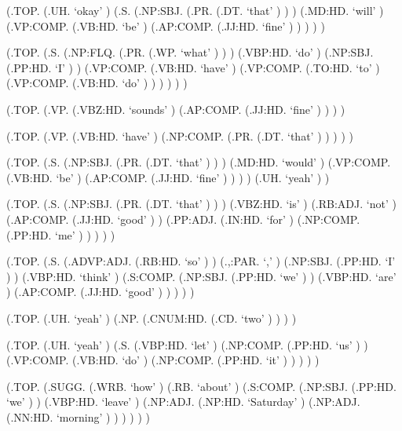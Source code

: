 \documentclass[10pt]{article}
\begin{document}
\begin{parsetree}  (.TOP. (.UH. `okay' ) (.S. (.NP:SBJ. (.PR. (.DT. `that' ) ) ) (.MD:HD. `will' ) (.VP:COMP. (.VB:HD. `be' ) (.AP:COMP. (.JJ:HD. `fine' ) ) ) ) ) \end{parsetree}

\begin{parsetree}  (.TOP. (.S. (.NP:FLQ. (.PR. (.WP. `what' ) ) ) (.VBP:HD. `do' ) (.NP:SBJ. (.PP:HD. `I' ) ) (.VP:COMP. (.VB:HD. `have' ) (.VP:COMP. (.TO:HD. `to' ) (.VP:COMP. (.VB:HD. `do' ) ) ) ) ) ) \end{parsetree}

\begin{parsetree}  (.TOP. (.VP. (.VBZ:HD. `sounds' ) (.AP:COMP. (.JJ:HD. `fine' ) ) ) ) \end{parsetree}

\begin{parsetree}  (.TOP. (.VP. (.VB:HD. `have' ) (.NP:COMP. (.PR. (.DT. `that' ) ) ) ) ) \end{parsetree}

\begin{parsetree}  (.TOP. (.S. (.NP:SBJ. (.PR. (.DT. `that' ) ) ) (.MD:HD. `would' ) (.VP:COMP. (.VB:HD. `be' ) (.AP:COMP. (.JJ:HD. `fine' ) ) ) ) (.UH. `yeah' ) ) \end{parsetree}

\begin{parsetree}  (.TOP. (.S. (.NP:SBJ. (.PR. (.DT. `that' ) ) ) (.VBZ:HD. `is' ) (.RB:ADJ. `not' ) (.AP:COMP. (.JJ:HD. `good' ) ) (.PP:ADJ. (.IN:HD. `for' ) (.NP:COMP. (.PP:HD. `me' ) ) ) ) ) \end{parsetree}

\begin{parsetree}  (.TOP. (.S. (.ADVP:ADJ. (.RB:HD. `so' ) ) (.,:PAR. `,' ) (.NP:SBJ. (.PP:HD. `I' ) ) (.VBP:HD. `think' ) (.S:COMP. (.NP:SBJ. (.PP:HD. `we' ) ) (.VBP:HD. `are' ) (.AP:COMP. (.JJ:HD. `good' ) ) ) ) ) \end{parsetree}

\begin{parsetree}  (.TOP. (.UH. `yeah' ) (.NP. (.CNUM:HD. (.CD. `two' ) ) ) ) \end{parsetree}

\begin{parsetree}  (.TOP. (.UH. `yeah' ) (.S. (.VBP:HD. `let' ) (.NP:COMP. (.PP:HD. `us' ) ) (.VP:COMP. (.VB:HD. `do' ) (.NP:COMP. (.PP:HD. `it' ) ) ) ) ) \end{parsetree}

\begin{parsetree}  (.TOP. (.SUGG. (.WRB. `how' ) (.RB. `about' ) (.S:COMP. (.NP:SBJ. (.PP:HD. `we' ) ) (.VBP:HD. `leave' ) (.NP:ADJ. (.NP:HD. `Saturday' ) (.NP:ADJ. (.NN:HD. `morning' ) ) ) ) ) ) \end{parsetree}
\end{document}
